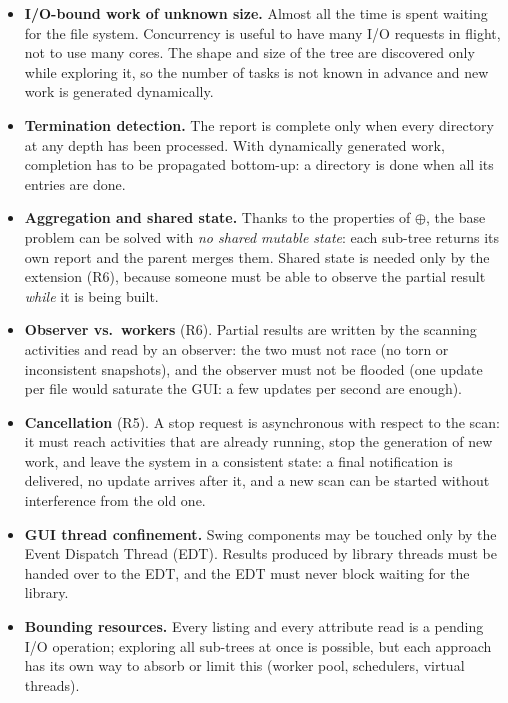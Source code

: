 \documentclass[11pt,a4paper]{article}
\begin{document}
\begin{itemize}
  \item \textbf{I/O-bound work of unknown size.} Almost all the time is spent waiting for the file
        system. Concurrency is useful to have many I/O requests in flight, not to use many cores. The
        shape and size of the tree are discovered only while exploring it, so the number of tasks is
        not known in advance and new work is generated dynamically.
  \item \textbf{Termination detection.} The report is complete only when every directory at any depth
        has been processed. With dynamically generated work, completion has to be propagated
        bottom-up: a directory is done when all its entries are done.
  \item \textbf{Aggregation and shared state.} Thanks to the properties of $\oplus$, the base problem
        can be solved with \emph{no shared mutable state}: each sub-tree returns its own report and
        the parent merges them. Shared state is needed only by the extension (R6), because someone
        must be able to observe the partial result \emph{while} it is being built.
  \item \textbf{Observer vs.\ workers} (R6). Partial results are written by the scanning activities
        and read by an observer: the two must not race (no torn or inconsistent snapshots), and the
        observer must not be flooded (one update per file would saturate the GUI: a few updates per
        second are enough).
  \item \textbf{Cancellation} (R5). A stop request is asynchronous with respect to the scan: it must
        reach activities that are already running, stop the generation of new work, and leave the
        system in a consistent state: a final notification is delivered, no update arrives after it,
        and a new scan can be started without interference from the old one.
  \item \textbf{GUI thread confinement.} Swing components may be touched only by the Event
        Dispatch Thread (EDT). Results produced by library threads must be handed over to the EDT, and
        the EDT must never block waiting for the library.
  \item \textbf{Bounding resources.} Every listing and every attribute read is a pending I/O
        operation; exploring all sub-trees at once is possible, but each approach has its own way to
        absorb or limit this (worker pool, schedulers, virtual threads).
\end{itemize}
\end{document}
